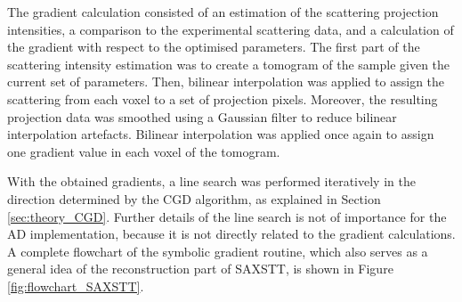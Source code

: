 The gradient calculation consisted of an estimation of the scattering projection intensities, a comparison to the experimental scattering data,
and a calculation of the gradient with respect to the optimised parameters.
The first part of the scattering intensity estimation was to create a tomogram of the sample given the current set of parameters.
Then, bilinear interpolation was applied to assign the scattering from each voxel to a set of projection pixels.
Moreover, the resulting projection data was smoothed using a Gaussian filter to reduce bilinear interpolation artefacts.
Bilinear interpolation was applied once again to assign one gradient value in each voxel of the tomogram. %

With the obtained gradients, a line search was performed iteratively in the direction determined by the CGD algorithm, as explained in Section \ref{sec:theory_CGD}.
Further details of the line search is not of importance for the AD implementation, because it is not directly related to the gradient calculations.
A complete flowchart of the symbolic gradient routine, which also serves as a general idea of the reconstruction part of SAXSTT, is shown in Figure \ref{fig:flowchart_SAXSTT}.




